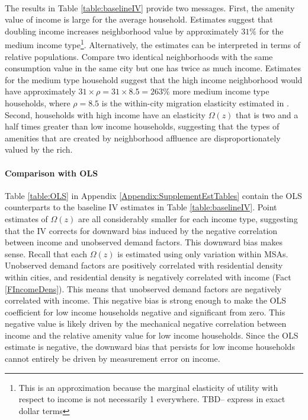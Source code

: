 \documentclass[11pt]{article}
\begin{document}
\paragraph*{}
The results in Table \ref{table:baselineIV} provide two messages. First, the amenity value of income is large for the average household. Estimates suggest that doubling income increases neighborhood value by approximately $31 \%$ for the medium income type\footnote{This is an approximation because the marginal elasticity of utility with respect to income is not necessarily 1 everywhere. TBD-- express in exact dollar terms}. Alternatively, the estimates can be interpreted in terms of relative populations. Compare two identical neighborhoods with the same consumption value in the same city but one has twice as much income. Estimates for the medium type household suggest that the high income neighborhood would have approximately $31 \times \rho = 31 \times 8.5 = 263 \%$ more medium income type households, where $\rho=8.5$ is the within-city migration elasticity estimated in \cite{BSH}. Second, households with high income have an elasticity $\Omega(z)$ that is two and a half times greater than low income households, suggesting that the types of amenities that are created by neighborhood affluence are disproportionately valued by the rich.

\paragraph*{Comparison with OLS} Table \ref{table:OLS} in Appendix \ref{Appendix:SupplementEstTables} contain the OLS counterparts to the baseline IV estimates in Table \ref{table:baselineIV}. Point estimates of $\Omega(z)$ are all considerably smaller for each income type, suggesting that the IV corrects for downward bias induced by the negative correlation between income and unobserved demand factors. This downward bias makes sense. Recall that each $\Omega(z)$ is estimated using only variation within MSAs. Unobserved demand factors are positively correlated with residential density within cities, and residential density is negatively correlated with income (Fact \ref{FIncomeDens}). This means that unobserved demand factors are negatively correlated with income. This negative bias is strong enough to make the OLS coefficient for low income households negative and significant from zero. This negative value is likely driven by the mechanical negative correlation between income and the relative amenity value for low income households. Since the OLS estimate is negative, the downward bias that persists for low income households cannot entirely be driven by measurement error on income. 
\end{document}
